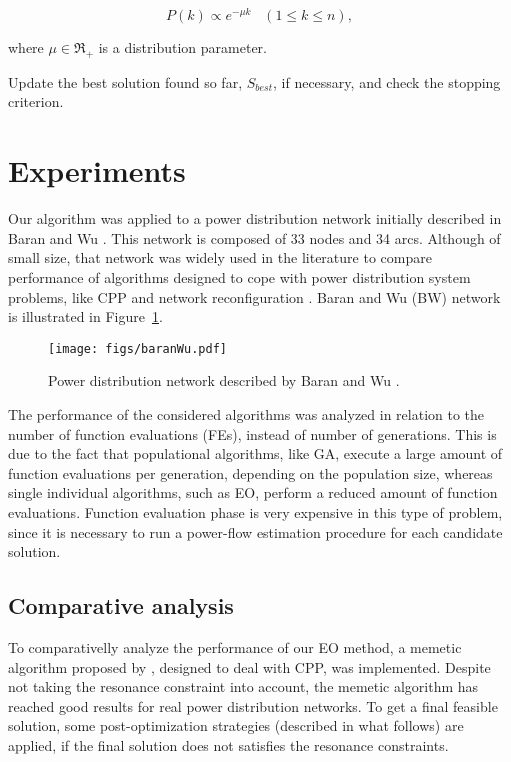 \documentclass[11pt]{article}
\begin{document}
\begin{equation}
	P(k) \propto e^{-\mu k}\;\;\;(1\leq k \leq n),
	\label{eq:leipotexp}
\end{equation}

\noindent where $\mu \in \Re_+$ is a distribution parameter. 

Update the best solution found so far, $S_{best}$, if necessary, and check the 
stopping criterion.

\section{Experiments}
\label{sec:experimentos}

Our algorithm was applied to a power distribution network initially described in Baran and Wu \citep{Baran1989}.
This network is composed of 33 nodes and 34 arcs. Although of small size, that network was widely used in
the literature to compare performance of algorithms designed to cope with power distribution system problems, like CPP 
and network reconfiguration \citep{Madeiro2011,Jeon2002,Jeon2004}. Baran and Wu (BW) network is illustrated in Figure~\ref{fig:redeWu}.

\begin{figure}[!ht]
	\centering
	\texttt{[image: figs/baranWu.pdf]}
	\caption{Power distribution network described by Baran and Wu \citep{Baran1989}.}
	\label{fig:redeWu}
\end{figure}

The performance of the considered algorithms was analyzed in relation to the number of function evaluations (FEs),
instead of number of generations. This is due to the fact that populational algorithms, like GA, execute
a large amount of function evaluations per generation, depending on the population size, whereas single individual
algorithms, such as EO, perform a reduced amount of function evaluations. Function evaluation phase is
very expensive in this type of problem, since it is necessary to run a power-flow estimation procedure for each
candidate solution.

\subsection{Comparative analysis}
\label{sec:algoritmoscomparacao}

To comparativelly analyze the performance of our EO method, a memetic 
algorithm proposed by \citep{Mendes2005}, designed to deal with CPP, was implemented.
Despite not taking the resonance constraint into account, the memetic algorithm has reached
good results for real power distribution networks. To get a final feasible solution,
some post-optimization strategies (described in what follows) are applied, if the final
solution does not satisfies the resonance constraints.
\end{document}
